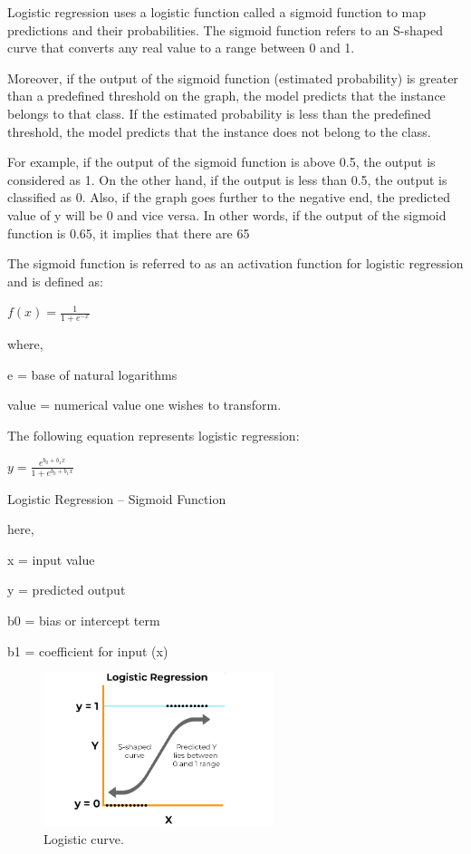 \documentclass{article}
\begin{document}
Logistic regression uses a logistic function called a sigmoid function to map predictions and their probabilities. The sigmoid function refers to an S-shaped curve that converts any real value to a range between 0 and 1.

Moreover, if the output of the sigmoid function (estimated probability) is greater than a predefined threshold on the graph, the model predicts that the instance belongs to that class. If the estimated probability is less than the predefined threshold, the model predicts that the instance does not belong to the class.

For example, if the output of the sigmoid function is above 0.5, the output is considered as 1. On the other hand, if the output is less than 0.5, the output is classified as 0. Also, if the graph goes further to the negative end, the predicted value of y will be 0 and vice versa. In other words, if the output of the sigmoid function is 0.65, it implies that there are 65%

The sigmoid function is referred to as an activation function for logistic regression and is defined as:

$f(x) = \frac{1}{1+ e^{-x}}$

where,

e = base of natural logarithms

value = numerical value one wishes to transform.

The following equation represents logistic regression:

$y= \frac{e^{b_0+b_1x}}{1+ e^{b_0+b_1x} }$

Logistic Regression – Sigmoid Function

here,

x = input value

y = predicted output

b0 = bias or intercept term

b1 = coefficient for input (x)


\begin{figure}[h!]
  \centering
  \includegraphics[width=0.6\textwidth]{logistic.png}
  \caption{Logistic curve.}
\end{figure}
\end{document}
